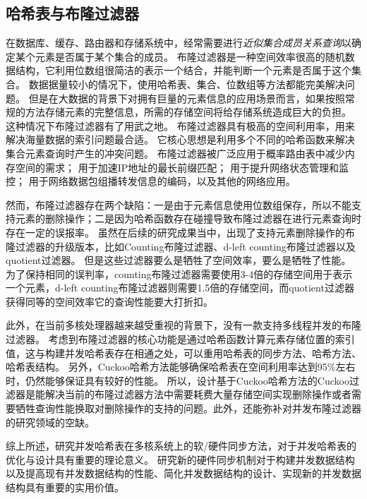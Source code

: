 \subsection{哈希表与布隆过滤器}

在数据库、缓存、路由器和存储系统中，经常需要进行\textit{近似集合成员关系查询}以确定某个元素是否属于某个集合的成员。
布隆过滤器是一种空间效率很高的随机数据结构，它利用位数组很简洁的表示一个结合，并能判断一个元素是否属于这个集合。
数据据量较小的情况下，使用哈希表、集合、位数组等方法都能完美解决问题。
但是在大数据的背景下对拥有巨量的元素信息的应用场景而言，如果按照常规的方法存储元素的完整信息，所需的存储空间将给存储系统造成巨大的负担。
这种情况下布隆过滤器有了用武之地。
布隆过滤器具有极高的空间利用率，用来解决海量数据的索引问题最合适。
它核心思想是利用多个不同的哈希函数来解决集合元素查询时产生的冲突问题。
布隆过滤器被广泛应用于概率路由表中减少内存空间的需求\cite{yu2009buffalo}；
用于加速IP地址的最长前缀匹配\cite{dharmapurikar2003longest}；
用于提升网络状态管理和监控\cite{bonomi2006beyond,song2005fast}；
用于网络数据包组播转发信息的编码\cite{jokela2009lipsin}，以及其他的网络应用\cite{broder2004network}。

然而，布隆过滤器存在两个缺陷：一是由于元素信息使用位数组保存，所以不能支持元素的删除操作；二是因为哈希函数存在碰撞导致布隆过滤器在进行元素查询时存在一定的误报率。
虽然在后续的研究成果当中，出现了支持元素删除操作的布隆过滤器的升级版本，比如Counting布隆过滤器\cite{fan2000summary}、d-left counting布隆过滤器\cite{bonomi2006improved}以及quotient过滤器\cite{bender2012don}。
但是这些过滤器要么是牺牲了空间效率，要么是牺牲了性能。
为了保持相同的误判率，counting布隆过滤器需要使用3-4倍的存储空间用于表示一个元素，d-left counting布隆过滤器则需要1.5倍的存储空间，而quotient过滤器获得同等的空间效率它的查询性能要大打折扣。

此外，在当前多核处理器越来越受重视的背景下，没有一款支持多线程并发的布隆过滤器。
考虑到布隆过滤器的核心功能是通过哈希函数计算元素存储位置的索引值，这与构建并发哈希表存在相通之处，可以重用哈希表的同步方法、哈希方法、哈希表结构。
另外，Cuckoo哈希方法能够确保哈希表在空间利用率达到95\%左右时，仍然能够保证具有较好的性能。
所以，设计基于Cuckoo哈希方法的Cuckoo过滤器是能解决当前的布隆过滤器方法中需要耗费大量存储空间实现删除操作或者需要牺牲查询性能换取对删除操作的支持的问题。此外，还能弥补对并发布隆过滤器的研究领域的空缺。

综上所述，研究并发哈希表在多核系统上的软/硬件同步方法，对于并发哈希表的优化与设计具有重要的理论意义。
研究新的硬件同步机制对于构建并发数据结构以及提高现有并发数据结构的性能、简化并发数据结构的设计、实现新的并发数据结构具有重要的实用价值。



